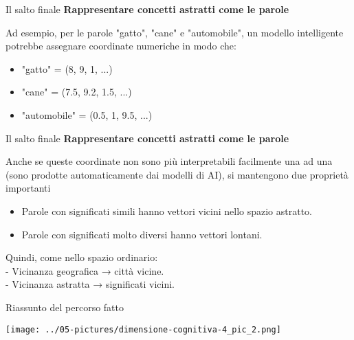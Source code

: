 \documentclass[aspectratio=169]{beamer}
\begin{document}
%
%
\begin{frame}{Il salto finale}
\textbf{Rappresentare concetti astratti come le parole}\\
\vspace{0.5cm}

Ad esempio, per le parole "gatto", "cane" e "automobile", un modello intelligente potrebbe assegnare coordinate numeriche in modo che:
\begin{itemize}
\item "gatto" = (8, 9, 1, ...)
\item "cane" = (7.5, 9.2, 1.5, ...)
\item "automobile" = (0.5, 1, 9.5, ...)
\end{itemize}
\end{frame}
%
%
\begin{frame}{Il salto finale}
\textbf{Rappresentare concetti astratti come le parole}\\
\vspace{0.5cm}

Anche se queste coordinate non sono più interpretabili facilmente una ad una (sono prodotte automaticamente dai modelli di AI), si mantengono due proprietà importanti
\begin{itemize}
\item Parole con significati simili hanno vettori vicini nello spazio astratto.
\item Parole con significati molto diversi hanno vettori lontani.
\end{itemize}

Quindi, come nello spazio ordinario:\\
\vspace{.3cm}
- Vicinanza geografica → città vicine.\\
- Vicinanza astratta → significati vicini.

\end{frame}
%
%
\begin{frame}{Riassunto del percorso fatto}
\begin{center}
\texttt{[image: ../05-pictures/dimensione-cognitiva-4\_pic\_2.png]} 
\end{center}
\end{frame}
%
\end{document}
